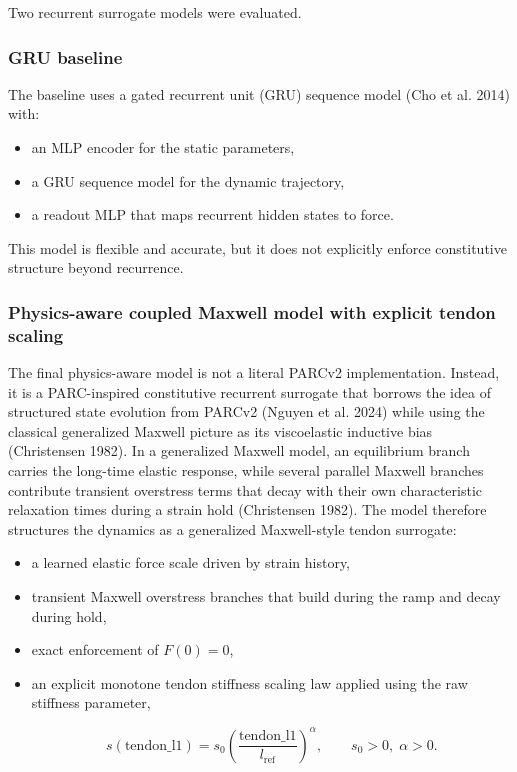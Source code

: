 \documentclass[
  10pt,
  letterpaper,
  DIV=11,
  numbers=noendperiod]{scrartcl}
\providecommand{\tightlist}{%
  \setlength{\itemsep}{0pt}\setlength{\parskip}{0pt}}
\begin{document}
Two recurrent surrogate models were evaluated.

\subsubsection{GRU baseline}\label{gru-baseline}

The baseline uses a gated recurrent unit (GRU) sequence model (Cho et
al. 2014) with:

\begin{itemize}
\tightlist
\item
  an MLP encoder for the static parameters,
\item
  a GRU sequence model for the dynamic trajectory,
\item
  a readout MLP that maps recurrent hidden states to force.
\end{itemize}

This model is flexible and accurate, but it does not explicitly enforce
constitutive structure beyond recurrence.

\subsubsection{Physics-aware coupled Maxwell model with explicit tendon
scaling}\label{physics-aware-coupled-maxwell-model-with-explicit-tendon-scaling}

The final physics-aware model is not a literal PARCv2 implementation.
Instead, it is a PARC-inspired constitutive recurrent surrogate that
borrows the idea of structured state evolution from PARCv2 (Nguyen et
al. 2024) while using the classical generalized Maxwell picture as its
viscoelastic inductive bias (Christensen 1982). In a generalized Maxwell
model, an equilibrium branch carries the long-time elastic response,
while several parallel Maxwell branches contribute transient overstress
terms that decay with their own characteristic relaxation times during a
strain hold (Christensen 1982). The model therefore structures the
dynamics as a generalized Maxwell-style tendon surrogate:

\begin{itemize}
\item
  a learned elastic force scale driven by strain history,
\item
  transient Maxwell overstress branches that build during the ramp and
  decay during hold,
\item
  exact enforcement of \(F(0) = 0\),
\item
  an explicit monotone tendon stiffness scaling law applied using the
  raw stiffness parameter,

  \[
  s(\mathrm{tendon\_l1}) = s_0 \left(\frac{\mathrm{tendon\_l1}}{l_{\mathrm{ref}}}\right)^{\alpha},
  \qquad s_0 > 0, \; \alpha > 0.
  \]
\end{itemize}
\end{document}
